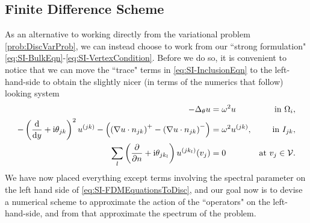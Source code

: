 \subsection{Finite Difference Scheme} \label{ssec:FDMSingInc}
As an alternative to working directly from the variational problem \ref{prob:DiscVarProb}, we can instead choose to work from our ``strong formulation" \eqref{eq:SI-BulkEqn}-\eqref{eq:SI-VertexCondition}.
Before we do so, it is convenient to notice that we can move the ``trace" terms in \eqref{eq:SI-InclusionEqn} to the left-hand-side to obtain the slightly nicer (in terms of the numerics that follow) looking system
\begin{subequations} \label{eq:SI-FDMEquationsToDisc}
	\begin{align}
		-\Delta_\theta u 
		&= \omega^2 u 
		&\text{in } \Omega_i, \label{eq:SI-FDMBulk} \\
		- \left( \dfrac{\mathrm{d}}{\mathrm{d}y} + \mathrm{i}\theta_{jk} \right)^2u^{(jk)}  - \left( \left( \nabla u\cdot n_{jk} \right)^+ - \left( \nabla u\cdot n_{jk} \right)^- \right)
		&= \omega^2 u^{(jk)},
		&\text{in } I_{jk}, \label{eq:SI-FDMSkeleton} \\
		\sum_l \left( \dfrac{\partial }{\partial n}+\mathrm{i}\theta_{jk_l} \right) u^{(jk_l)}(v_j) 
		&= 0 
		&\text{at } v_j\in\mathcal{V}. \label{eq:SI-FDMVertex}
	\end{align}
\end{subequations}
We have now placed everything except terms involving the spectral parameter on the left hand side of \eqref{eq:SI-FDMEquationsToDisc}, and our goal now is to devise a numerical scheme to approximate the action of the ``operators" on the left-hand-side, and from that approximate the spectrum of the problem.

